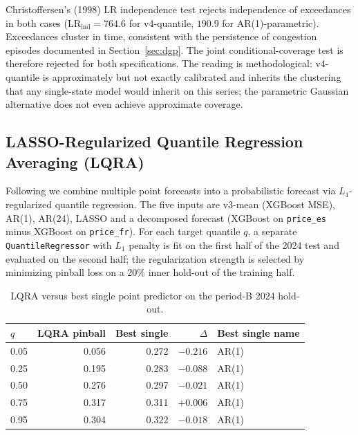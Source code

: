 \documentclass[11pt,a4paper]{article}
\begin{document}
Christoffersen's (1998) LR independence test rejects independence
of exceedances in both cases ($\mathrm{LR}_{\text{ind}} = 764.6$ for
v4-quantile, $190.9$ for AR(1)-parametric). Exceedances cluster in
time, consistent with the persistence of congestion episodes
documented in Section~\ref{sec:dgp}. The joint
conditional-coverage test is therefore rejected for both
specifications. The reading is methodological: v4-quantile is
approximately but not exactly calibrated and inherits the clustering
that any single-state model would inherit on this series; the
parametric Gaussian alternative does not even achieve approximate
coverage.

\subsection{LASSO-Regularized Quantile Regression Averaging
(LQRA)}\label{sec:lqra}

Following \citet{UniejewskiWeron2021} we combine multiple point
forecasts into a probabilistic forecast via $L_1$-regularized
quantile regression. The five inputs are v3-mean (XGBoost MSE),
AR(1), AR(24), LASSO and a decomposed forecast (XGBoost on
\texttt{price\_es} minus XGBoost on \texttt{price\_fr}). For each
target quantile $q$, a separate \texttt{QuantileRegressor} with
$L_1$ penalty is fit on the first half of the 2024 test and
evaluated on the second half; the regularization strength is
selected by minimizing pinball loss on a 20\% inner hold-out of the
training half.

\begin{table}[H]
\centering
\small
\caption{LQRA versus best single point predictor on the
period-B 2024 hold-out.}
\label{tab:lqra}
\begin{tabular}{lrrrl}
\toprule
\textbf{$q$} & \textbf{LQRA pinball} & \textbf{Best single}
& \textbf{$\Delta$} & \textbf{Best single name} \\
\midrule
0.05 & 0.056 & 0.272 & $-0.216$ & AR(1) \\
0.25 & 0.195 & 0.283 & $-0.088$ & AR(1) \\
0.50 & 0.276 & 0.297 & $-0.021$ & AR(1) \\
0.75 & 0.317 & 0.311 & $+0.006$ & AR(1) \\
0.95 & 0.304 & 0.322 & $-0.018$ & AR(1) \\
\bottomrule
\end{tabular}
\end{table}
\end{document}
